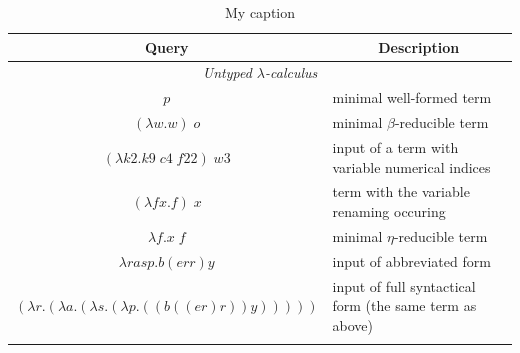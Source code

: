 \documentclass[table, a4paper, 10pt]{article}
\begin{document}
\begin{table}[H]\scriptsize
\centering
\caption{My caption}
\label{my-label}
\begin{tabular}{cl}
\hline
\multicolumn{1}{|c|}{\large Query}                                                                                  & \multicolumn{1}{c|}{\large Description}                                      \\ \hline
\multicolumn{2}{|c|}{\scriptsize \textit{Untyped $\lambda$-calculus}}                                                                                                                              \\ \hline
\multicolumn{1}{|c|}{$p$}                                                                                           & \multicolumn{1}{l|}{minimal well-formed term}                                \\ \hline
\multicolumn{1}{|c|}{$(\lambda w.w)\;o$}                                                                            & \multicolumn{1}{l|}{minimal $\beta$-reducible term}                          \\ \hline
\multicolumn{1}{|c|}{$(\lambda k2.k9\;c4\;f22)\;w3$}                                                               & \multicolumn{1}{l|}{input of a term with variable numerical indices}         \\ \hline
\multicolumn{1}{|c|}{$(\lambda fx.f)\;x$}                                                                           & \multicolumn{1}{l|}{term with the variable renaming occuring}                \\ \hline
\multicolumn{1}{|c|}{$\lambda f.x\;f$}                                                                              & \multicolumn{1}{l|}{minimal $\eta$-reducible term}                           \\ \hline
\multicolumn{1}{|c|}{$\lambda rasp.b(err)y$}                                                                        & \multicolumn{1}{l|}{input of abbreviated form}                               \\ \hline
\multicolumn{1}{|c|}{$(\lambda r.(\lambda a.(\lambda s.(\lambda p.((b((er)r))y)))))$}                               & \multicolumn{1}{l|}{input of full syntactical form (the same term as above)} \\ \hline
\multicolumn{1}{|l|}{}                                                                                              & \multicolumn{1}{l|}{}                                                        \\ \hline

\end{tabular}
\end{table}
\end{document}
